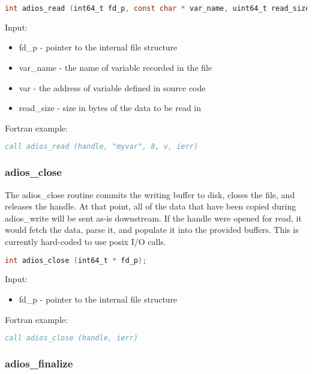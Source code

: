 \begin{lstlisting}[language=C,caption={},label={}]
int adios_read (int64_t fd_p, const char * var_name, uint64_t read_size, void * var)
\end{lstlisting}

Input:

\begin{itemize}
\item fd\_p - pointer to the internal file structure
\item var\_name - the name of variable recorded in the file
\item var - the address of variable defined in source code
\item read\_size -  size in bytes of the data to be read in 
\end{itemize}

Fortran example: 
\begin{lstlisting}[language=Fortran,caption={},label={}]
call adios_read (handle, "myvar", 8, v, ierr)
\end{lstlisting}

\subsubsection{adios\_close}

The adios\_close routine {\color{color01} commits the writing buffer to disk, closes 
the file, and releases the handle. At that point, all of the data that have been 
copied during adios\_write will be sent as-is downstream. If the handle were opened 
for read, it would fetch the data, parse it, and populate it into the provided 
buffers. This is currently hard-coded to use posix I/O calls.}

\begin{lstlisting}[language=C,caption={},label={}]
int adios_close (int64_t * fd_p);
\end{lstlisting}

Input: 
\begin{itemize}
\item fd\_p - pointer to the internal file structure
\end{itemize}

Fortran example: 
\begin{lstlisting}[language=Fortran,caption={},label={}]
call adios_close (handle, ierr)
\end{lstlisting}

\subsubsection{adios\_finalize}

